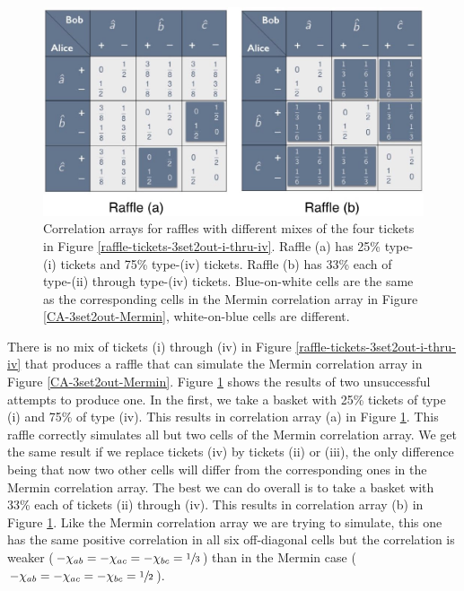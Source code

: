\begin{figure}[h]
 \centering
   \includegraphics[width=6in]{CA-3set2out-raffle-mix.jpeg} 
   \caption{Correlation arrays for raffles with different mixes of the four tickets in Figure \ref{raffle-tickets-3set2out-i-thru-iv}. Raffle (a) has 25\%  type-(i) tickets and 75\% type-(iv) tickets. Raffle (b) has 33\% each of type-(ii) through type-(iv) tickets. Blue-on-white cells are the same as the corresponding cells in the Mermin correlation array in Figure \ref{CA-3set2out-Mermin}, white-on-blue cells are different.}
   \label{CA-3set2out-raffle-mix}
\end{figure}

There is no mix of tickets (i) through (iv) in Figure \ref{raffle-tickets-3set2out-i-thru-iv} that produces a raffle that can simulate the Mermin correlation array in Figure \ref{CA-3set2out-Mermin}. Figure \ref{CA-3set2out-raffle-mix} shows the results of two unsuccessful attempts to produce one. In the first, we take a basket with 25\% tickets of type (i) and 75\% of type (iv). This results in correlation array (a) in Figure \ref{CA-3set2out-raffle-mix}. This raffle correctly simulates all but two cells of the Mermin correlation array. We get the same result if we replace tickets (iv) by tickets (ii) or (iii), the only difference being that now two other cells will differ from the corresponding ones in the Mermin correlation array. The best we can do overall is to take a basket with 33\% each of tickets (ii) through (iv). This results in correlation array (b) in Figure \ref{CA-3set2out-raffle-mix}. Like the Mermin correlation array we are trying to simulate, this one has the same positive correlation in all six off-diagonal cells but the correlation is weaker ($-\chi_{ab} = -\chi_{ac} = -\chi_{bc}  = \sfrac13$) than in the Mermin case ($-\chi_{ab} =-\chi_{ac}  = -\chi_{bc}  = \sfrac12$).

